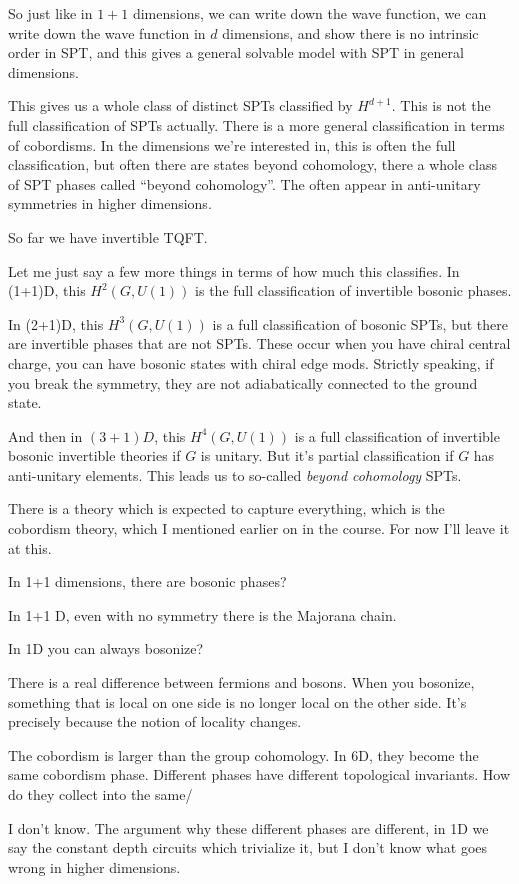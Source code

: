So just like in $1+1$ dimensions,
we can write down the wave function,
we can write down the wave function in $d$ dimensions,
and show there is no intrinsic order in SPT,
and this gives a general solvable model with SPT in general dimensions.

This gives us a whole class of distinct SPTs classified by $H^{d+1}$.
This is not the full classification of SPTs actually.
There is a more general classification in terms of cobordisms.
In the dimensions we're interested in,
this is often the full classification,
but often there are states beyond cohomology,
there a  whole class of SPT phases called ``beyond cohomology''.
The often appear in anti-unitary symmetries in higher dimensions.

So far we have invertible TQFT.

Let me just say a few more things in terms of how much this classifies.
In (1+1)D,
this $H^2\left( G, U(1) \right)$ is the full classification of invertible
bosonic phases.

In (2+1)D,
this $H^3(G,U(1))$ is a full classification of bosonic SPTs,
but there are invertible phases that are not SPTs.
These occur when you have chiral central charge,
you can have bosonic states with chiral edge mods.
Strictly speaking,
if you break the symmetry,
they are not adiabatically connected to the ground state.

And then in $(3+1)D$,
this $H^4\left( G, U(1) \right)$
is a full classification of invertible bosonic invertible theories if $G$ is
unitary.
But it's partial classification if $G$ has anti-unitary elements.
This leads us to so-called \emph{beyond cohomology} SPTs.

There is a theory which is expected to capture everything,
which is the cobordism theory,
which I mentioned earlier on in the course.
For now I'll leave it at this.


\begin{question}
    In 1+1 dimensions,
    there are bosonic phases?
\end{question}
In 1+1 D,
even with no symmetry there is the Majorana chain.

\begin{question}
    In 1D you can always bosonize?
\end{question}
There is a real difference between fermions and bosons.
When you bosonize,
something that is local on one side is no longer local on the other side.
It's precisely because the notion of locality changes.

\begin{question}
    The cobordism is larger than the group cohomology.
    In 6D,
    they become the same cobordism phase.
    Different phases have different topological invariants.
    How do they collect into the same/
\end{question}
I don't know.
The argument why these different phases are different,
in 1D we say the constant depth circuits which trivialize it,
but I don't know what goes wrong in higher dimensions.

